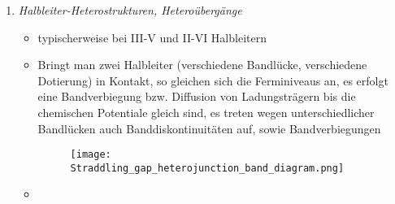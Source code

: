 \documentclass[11pt,a4paper]{article}
\begin{document}
\begin{enumerate}
\begin{itemize}
	\end{itemize}
	
	\item \emph{Halbleiter-Heterostrukturen, Heteroübergänge}
	
	\begin{itemize}
		
		\item typischerweise bei III-V und II-VI Halbleitern
		
		\item Bringt man zwei Halbleiter (verschiedene Bandlücke, verschiedene Dotierung) in Kontakt, so gleichen sich die Ferminiveaus an, es erfolgt eine Bandverbiegung bzw. Diffusion von Ladungsträgern bis die chemischen Potentiale gleich sind, es treten wegen unterschiedlicher Bandlücken auch Banddiskontinuitäten auf, sowie Bandverbiegungen
		\begin{figure}[H]
			\centering
			\texttt{[image: Straddling\_gap\_heterojunction\_band\_diagram.png]}
		\end{figure}
		
		\item 
		
	\end{itemize}
	
\end{enumerate}
\end{document}
